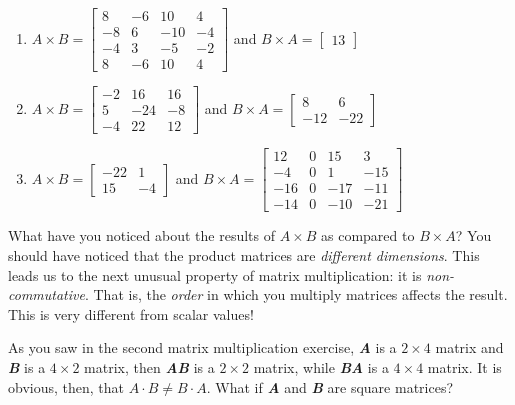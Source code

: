 \begin{Answer}[ref = mult_mat2]
\begin{enumerate}
\item $\mathbf{\mathit{A}} \times \mathbf{\mathit{B}} = \begin{bmatrix}
8 & -6 & 10 & 4\\
-8 & 6 & -10 & -4\\
-4 & 3 & -5 & -2\\
8 & -6 & 10 & 4
\end{bmatrix}$ and $\mathbf{\mathit{B}} \times \mathbf{\mathit{A}} =
\begin{bmatrix}
13
\end{bmatrix}$
\item $\mathbf{\mathit{A}} \times \mathbf{\mathit{B}} = \begin{bmatrix}
-2 & 16 & 16\\
5 & -24 & -8\\
-4 & 22 & 12
\end{bmatrix}$ and $\mathbf{\mathit{B}} \times \mathbf{\mathit{A}} =
\begin{bmatrix}
8 & 6\\
-12 & -22
\end{bmatrix}$
\item $\mathbf{\mathit{A}} \times \mathbf{\mathit{B}} = \begin{bmatrix}
-22 & 1\\
15 & -4
\end{bmatrix}$ and $\mathbf{\mathit{B}} \times \mathbf{\mathit{A}} =
\begin{bmatrix}
12 & 0 & 15 & 3\\
-4 & 0 & 1 & -15\\
-16 & 0 & -17 & -11\\
-14 & 0 & -10 & -21
\end{bmatrix}$
\end{enumerate}
\end{Answer}

What have you noticed about the results of $\mathbf{\mathit{A}} \times
\mathbf{\mathit{B}}$ as compared to $\mathbf{\mathit{B}} \times \mathbf{
\mathit{A}}$? You should have noticed that the product matrices are
\textit{different dimensions}. This leads us to the next unusual property of
matrix multiplication: it is \textit{non-commutative}. That is, the \textit{
order} in which you multiply matrices affects the result. This is very
different from scalar values!

As you saw in the second matrix multiplication exercise, \textbf{\textit{A}}
is a $2 \times 4$ matrix and \textbf{\textit{B}} is a $4 \times 2$ matrix,
then \textbf{\textit{A}}\textbf{\textit{B}} is a $2 \times 2$ matrix, while
\textbf{\textit{B}}\textbf{\textit{A}} is a $4 \times 4$ matrix. It is obvious,
then, that $\mathbf{\mathit{A}} \cdot \mathbf{\mathit{B}} \neq \mathbf{\mathit{
B}} \cdot \mathbf{\mathit{A}}$. What if \textbf{\textit{A}} and \textbf{\textit{
B}} are square matrices?

